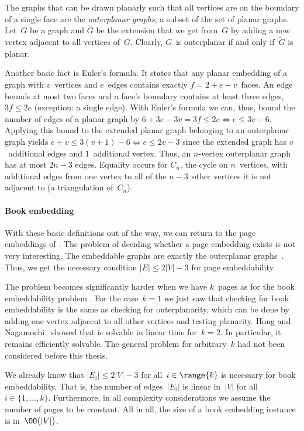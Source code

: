 The graphs that can be drawn planarly such that all vertices
are on the boundary of a single face are the \emph{outerplanar graphs}, a subset of the set of planar graphs.
Let~$G$ be a graph and $\widetilde{G}$ be the extension that we get from~$G$ by adding a new vertex
adjacent to all vertices of~$G$. Clearly, $G$~is outerplanar
if and only if~$\widetilde{G}$ is planar.

Another basic fact is Euler's formula. It states that any planar embedding of
a graph with $v$~vertices and $e$~edges contains exactly $f = 2 + e - v$~faces. An edge
bounds at most two faces and a face's boundary contains at least three edges, \ie $3f \le 2e$ (exception: a single edge).  With
Euler's formula we can, thus, bound the number of edges of a planar graph
by $6 + 3e - 3v = 3f \le 2e \iff e \le 3v - 6$. Applying this bound to the extended planar graph
belonging to an outerplanar graph yields $e + v \le 3(v + 1) - 6 \iff e \le 2v - 3$ since the
extended graph has $v$~additional edges and $1$~additional vertex. Thus, an $n$-vertex
outerplanar graph has at most $2n - 3$ edges. Equality occurs for $C_n$, the cycle on $n$~vertices, with
additional edges from one vertex to all of the $n-3$~other vertices it is not adjacent to (a triangulation of~$C_n$).

\paragraph{Book embedding}



With these basic definitions out of the way, we can return to the page embeddings of . The problem of deciding whether a page embedding exists is not very interesting.
The embeddable graphs are exactly the outerplanar graphs~\cite{Bernhart79}.
Thus, we get the necessary condition \nopagebreak$|E| \leq 2|V| - 3$
for page embeddability.

The problem becomes significantly harder when we have $k$~pages as for the book embeddability problem \probBook. For the case~$k=1$ we just saw that checking for book embeddability is the same as checking for outerplanarity, which can be done by adding one vertex
adjacent to all other vertices and testing planarity. Hong and Nagamochi~\cite{two-page-09} 
showed that \probBook is solvable in linear time for~$k=2$. In particular, it remains efficiently solvable. The general problem for arbitrary~$k$ had not been considered before this thesis.

We already know that $|E_i| \leq  2|V| - 3$ for all~$i \in \range{k}$ is necessary for book
embeddability.
That is, the number of edges~$|E_i|$ is linear in~$|V|$ for all~$i \in \{1,\dotsc, k\}$. Furthermore, in all complexity considerations we assume the
number of pages to be constant. All in all, the size of a book embedding instance is in~$\OO\bigl(|V|\bigr)$.

